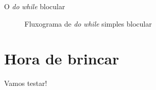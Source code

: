 \documentclass[14pt]{beamer}
\begin{document}
		\begin{frame}{O \textit{do} \textit{while} blocular}
			\begin{figure}[H]
				\centering
				
				\caption{Fluxograma de \textit{do} \textit{while} simples blocular}
				\label{fig.flow.while.block}
			\end{figure}
		\end{frame}

	\section{Hora de brincar}
		\begin{frame}
			\begin{center}\Huge
				Vamos testar!
			\end{center}
		\end{frame}
\end{document}
